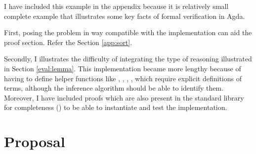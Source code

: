 \documentclass[12pt,twoside,notitlepage]{report}
\begin{document}
I have included this example in the appendix because it is relatively small complete example that illustrates some key facts of formal verification in Agda.

First, posing the problem in way compatible with the implementation can aid the proof section. Refer the Section \ref{app:sort}. 

Secondly, I illustrates the difficulty of integrating the type of reasoning illustrated in Section \ref{eval:lemma}. This implementation became more lengthy because of having to define helper functions like , , , , which require explicit definitions of terms, although the inference algorithm should be able to identify them. Moreover, I have included proofs which are also present in the standard library for completeness () to be able to instantiate and test the implementation.
 
\section{Proposal}


\end{document}

